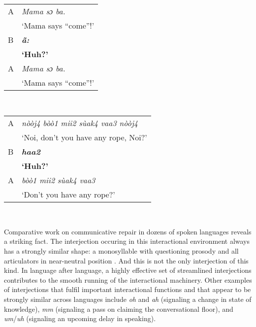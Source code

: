 \documentclass[output=paper]{langsci/langscibook}
\begin{document}
\ea
\ea
{}\\
  \begin{tabular}{ll}
    A   & \textit{Mama sɔ ba.}\\
	&‘Mama says “come”!’ \\
    B 	& \textbf{\textit{ã:}}\\
	&\textbf{‘Huh?’}\\
    A   &\textit{Mama sɔ ba.}\\
	&‘Mama says “come”!’  
    \end{tabular}
  \ex
  \\
  \begin{tabular}{ll}
    A 	& \textit{nòòj4 bòò1 mii2 sùak4 vaa3 nòòj4}\\
	& ‘Noi, don’t you have any rope, Noi?’\\
    B 	& \textbf{\textit{haa2}}\\
	&  \textbf{‘Huh?’}\\
      A & \textit{bòò1 mii2 sùak4 vaa3}\\
	&  ‘Don’t you have any rope?’\\
    \end{tabular}\\
\z
\z


\largerpage

Comparative work on communicative repair in dozens of spoken languages reveals a striking fact. The interjection occuring in this interactional environment always has a strongly similar shape: a monosyllable with questioning prosody and all articulators in near-neutral position \citep{Dingemanse2013}. And this is not the only interjection of this kind. In language after language, a highly effective set of streamlined interjections contributes to the smooth running of the interactional machinery. Other examples of interjections that fulfil important interactional functions and that appear to be strongly similar across languages include \textit{oh} and \textit{ah }(signaling a change in state of knowledge), \textit{mm }(signaling a pass on claiming the conversational floor), and \textit{um}/\textit{uh} (signaling an upcoming delay in speaking). 
\end{document}
